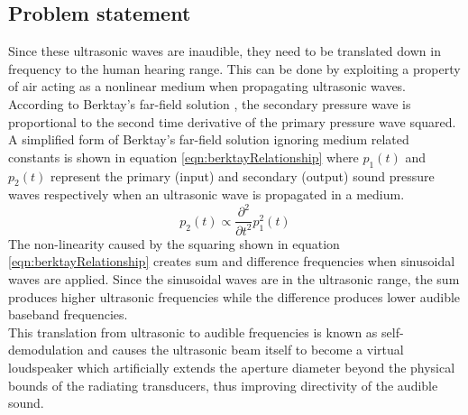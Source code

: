 \documentclass[final,32pt]{beamer}
\begin{document}
\begin{frame}[t]
\begin{multicols}{3}
\subsection{Problem statement}
Since these ultrasonic waves are inaudible, they need to be translated down in frequency to the human hearing range. This can be done by exploiting a property of air acting as a nonlinear medium when propagating ultrasonic waves. According to Berktay's far-field solution \cite{berktay_1965}, the secondary pressure wave is proportional to the second time derivative of the primary pressure wave squared. A simplified form of Berktay's far-field solution ignoring medium related constants is shown in equation \ref{eqn:berktayRelationship} where $p_1 (t)$ and $p_2 (t)$ represent the primary (input) and secondary (output) sound pressure waves respectively when an ultrasonic wave is propagated in a medium.
\begin{equation}
    p_2(t) \propto \frac{\partial^2}{\partial t^2}p_1^2(t)
    \label{eqn:berktayRelationship}
\end{equation}
The non-linearity caused by the squaring shown in equation \ref{eqn:berktayRelationship} creates sum and difference frequencies when sinusoidal waves are applied. Since the sinusoidal waves are in the ultrasonic range, the sum produces higher ultrasonic frequencies while the difference produces lower audible baseband frequencies.\\
This translation from ultrasonic to audible frequencies is known as self-demodulation and causes the ultrasonic beam itself to become a virtual loudspeaker which artificially extends the aperture diameter beyond the physical bounds of the radiating transducers, thus improving directivity of the audible sound.


\end{multicols}
\end{frame}
\end{document}
